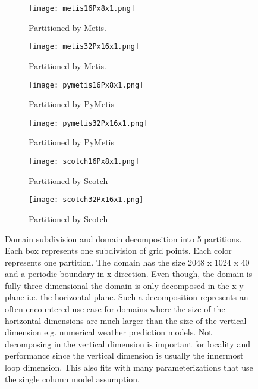 \begin{figure}[!htbp]
\centering
\begin{subfigure}{0.6\textwidth}
  \centering
  \texttt{[image: metis16Px8x1.png]}
  \caption{Partitioned by Metis.}
  \label{fig:metis1}
\end{subfigure}%
\begin{subfigure}{0.6\textwidth}
  \centering
  \texttt{[image: metis32Px16x1.png]}
  \caption{Partitioned by Metis.}
  \label{fig:metis2}
\end{subfigure}

\begin{subfigure}{0.6\textwidth}
  \centering
  \texttt{[image: pymetis16Px8x1.png]}
  \caption{Partitioned by PyMetis}
  \label{fig:pymetis1}
\end{subfigure}%
\begin{subfigure}{0.6\textwidth}
  \centering
  \texttt{[image: pymetis32Px16x1.png]}
  \caption{Partitioned by PyMetis}
  \label{fig:pymetis2}
\end{subfigure}

\begin{subfigure}{0.6\textwidth}
  \centering
  \texttt{[image: scotch16Px8x1.png]}
  \caption{Partitioned by Scotch}
  \label{fig:scotch1}
\end{subfigure}%
\begin{subfigure}{0.6\textwidth}
  \centering
  \texttt{[image: scotch32Px16x1.png]}
  \caption{Partitioned by Scotch}
  \label{fig:scotch2}
\end{subfigure}

\caption{Domain subdivision and domain decomposition into 5 partitions. 
Each box represents one subdivision of grid points.
Each color represents one partition. 
The domain has the size 2048 x 1024 x 40 and a periodic boundary in x-direction.
Even though, the domain is fully three dimensional the domain is only decomposed in the x-y plane i.e. the horizontal plane.
Such a decomposition represents an often encountered use case for domains where the size of the horizontal dimensions are much larger than the size of the vertical dimension e.g. numerical weather prediction models.
Not decomposing in the vertical dimension is important for locality and performance since the vertical dimension is usually the innermost loop dimension.
This also fits with many parameterizations that use the single column model assumption.
}
\label{fig:rectangular1}
\end{figure}

